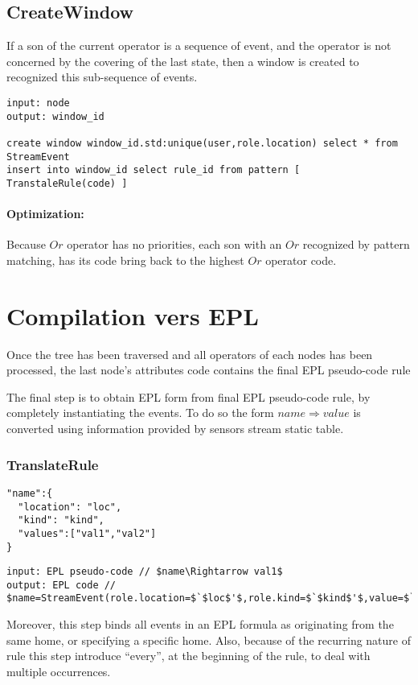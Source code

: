 \subsection*{CreateWindow}
If a son of the current operator is a sequence of event, and the operator is not concerned by the covering of the last state, then a window is created to recognized this sub-sequence of events.
\begin{lstlisting}[frame=single]
input: node
output: window_id

create window window_id.std:unique(user,role.location) select * from StreamEvent
insert into window_id select rule_id from pattern [ TranstaleRule(code) ]
\end{lstlisting}
\paragraph{Optimization:} Because $Or$ operator has no priorities, each son with an $Or$ recognized by pattern matching, has its code bring back to the highest $Or$ operator code.
\section{Compilation vers EPL}
Once the tree has been traversed and all operators of each nodes has been processed, the last node's attributes code contains the final EPL pseudo-code rule
 
The final step is to obtain EPL form from final EPL pseudo-code rule, by completely instantiating the events.
To do so the form $name\Rightarrow value$ is converted using information provided by sensors stream static table.
\subsubsection*{TranslateRule}
\begin{lstlisting}[frame=single]
"name":{
  "location": "loc",
  "kind": "kind",
  "values":["val1","val2"]
}
\end{lstlisting}

\begin{lstlisting}[frame=single]
input: EPL pseudo-code // $name\Rightarrow val1$
output: EPL code // $name=StreamEvent(role.location=$`$loc$'$,role.kind=$`$kind$'$,value=$`$val1$'$)$
\end{lstlisting}
Moreover, this step binds all events in an EPL formula as originating from the same home, or specifying a specific home. 
Also, because of the recurring nature of rule this step introduce ``every'', at the beginning of the rule, to deal with multiple occurrences.
